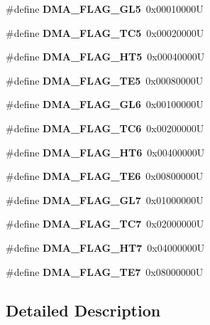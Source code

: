 \begin{DoxyCompactItemize}
\#define {\bfseries D\+M\+A\+\_\+\+F\+L\+A\+G\+\_\+\+G\+L5}~0x00010000U
\item 
\mbox{\label{group___d_m_a__flag__definitions_ga2e3a81f03ed107dbb60cfa7560c32e97}} 
\#define {\bfseries D\+M\+A\+\_\+\+F\+L\+A\+G\+\_\+\+T\+C5}~0x00020000U
\item 
\mbox{\label{group___d_m_a__flag__definitions_ga3f7bd37a3c6a833a5e8dd011f7ef9acd}} 
\#define {\bfseries D\+M\+A\+\_\+\+F\+L\+A\+G\+\_\+\+H\+T5}~0x00040000U
\item 
\mbox{\label{group___d_m_a__flag__definitions_ga04a05f5cc8f193757d8658d97a857b3a}} 
\#define {\bfseries D\+M\+A\+\_\+\+F\+L\+A\+G\+\_\+\+T\+E5}~0x00080000U
\item 
\mbox{\label{group___d_m_a__flag__definitions_ga2ea0eb984d33f6788a59f49dcd2acee0}} 
\#define {\bfseries D\+M\+A\+\_\+\+F\+L\+A\+G\+\_\+\+G\+L6}~0x00100000U
\item 
\mbox{\label{group___d_m_a__flag__definitions_ga1e3da05635b4165ce2a0075646cc9131}} 
\#define {\bfseries D\+M\+A\+\_\+\+F\+L\+A\+G\+\_\+\+T\+C6}~0x00200000U
\item 
\mbox{\label{group___d_m_a__flag__definitions_ga37e18ea9dab110bafc8de3b6aedabb02}} 
\#define {\bfseries D\+M\+A\+\_\+\+F\+L\+A\+G\+\_\+\+H\+T6}~0x00400000U
\item 
\mbox{\label{group___d_m_a__flag__definitions_ga50e2f489b50cbe42d03a80ca7cd42dad}} 
\#define {\bfseries D\+M\+A\+\_\+\+F\+L\+A\+G\+\_\+\+T\+E6}~0x00800000U
\item 
\mbox{\label{group___d_m_a__flag__definitions_gaf4619624c5d2cde7fc58bc4cd400bfc3}} 
\#define {\bfseries D\+M\+A\+\_\+\+F\+L\+A\+G\+\_\+\+G\+L7}~0x01000000U
\item 
\mbox{\label{group___d_m_a__flag__definitions_gaacfd9fe9de9727dd862aa475b3d5aee8}} 
\#define {\bfseries D\+M\+A\+\_\+\+F\+L\+A\+G\+\_\+\+T\+C7}~0x02000000U
\item 
\mbox{\label{group___d_m_a__flag__definitions_ga8216565e4c640761fa93891006d43655}} 
\#define {\bfseries D\+M\+A\+\_\+\+F\+L\+A\+G\+\_\+\+H\+T7}~0x04000000U
\item 
\mbox{\label{group___d_m_a__flag__definitions_ga312e060067bffdf46136be4f7b0b614c}} 
\#define {\bfseries D\+M\+A\+\_\+\+F\+L\+A\+G\+\_\+\+T\+E7}~0x08000000U
\end{DoxyCompactItemize}


\subsection{Detailed Description}
